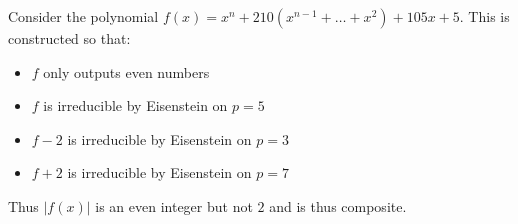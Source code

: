Consider the polynomial $f(x)=x^n+210(x^{n-1}+\ldots+x^2)+105x+5$. This is constructed so that:
\begin{itemize}
	\item $f$ only outputs even numbers
	\item $f$ is irreducible by Eisenstein on $p=5$
	\item $f-2$ is irreducible by Eisenstein on $p=3$
	\item $f+2$ is irreducible by Eisenstein on $p=7$
\end{itemize}
Thus $|f(x)|$ is an even integer but not $2$ and is thus composite.